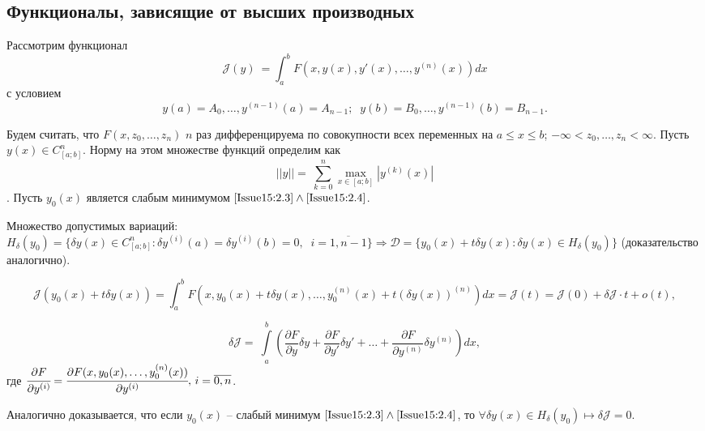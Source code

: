 
\subsection{Функционалы, зависящие от высших производных}
Рассмотрим функционал 
\begin{equation} 
	\label{Issue15:2.3}
	\mathcal{J}(y) ~ = \int_a^bF(x,y(x),y'(x),\dots , y^{(n)}(x))d x
\end{equation}
с условием 
\begin{equation}
	\label{Issue15:2.4}
	y(a)=A_0,\dots ,y^{(n-1)}(a)=A_{n-1};\;\;y(b)=B_0,\dots , y^{(n-1)}(b)=B_{n-1}.
\end{equation}

Будем считать, что $F(x,z_0,\dots , z_n)$ $n$ раз дифференцируема по совокупности всех переменных на $a\leqslant x\leqslant b$; $-\infty < z_0, \dots , z_n< \infty $. Пусть $y(x)\in C^n_{[a;b]}$. Норму на этом множестве функций определим как $$||y||= ~ \sum_{k=0}^{n}\underset{x \in [a;b]}{\max}|y^{(k)}(x)|$$.
Пусть $y_0(x)$ является слабым минимумом $\eqref{Issue15:2.3}\wedge \eqref{Issue15:2.4}$.

Множество допустимых вариаций: $H_\delta(y_0)=\{ \delta y(x) \in C_{[a;b]}^n: \delta y^{(i)}(a)=\delta y^{(i)}(b)=0,\;\;i=\overline{1,n-1}\}\Rightarrow \mathcal{D}=\{y_0(x)+t\delta y(x):\delta y(x)\in H_\delta (y_0) \}$ (доказательство аналогично).

\[
    \mathcal{J}(y_0(x)+t\delta y(x)) = \int^b_a F(x, y_0(x)+t\delta y(x),\dots ,y_0^{(n)}(x)+t(\delta y(x))^{(n)} )dx =\mathcal{J}(t)=\mathcal{J}(0)+\delta\mathcal{J} \cdot t+o(t), 
\]

\[
    \delta \mathcal{J}= ~ \int\limits_a^b\left(\frac{\partial F}{\partial y}\delta y + \frac{\partial F}{\partial y'}\delta y' +\dots +  \frac{\partial F}{\partial y^{(n)}}\delta y^{(n)} \right) dx,
\]
 где $\cfrac{\partial F}{\partial y^{(i)}}= \cfrac{\partial F(x,y_0(x),\dots,y_0^{(n)}(x))}{\partial y^{(i)}}, \, i = \overline{0, n}$.

Аналогично доказывается, что если $y_0(x)$ -- слабый минимум $\eqref{Issue15:2.3}\wedge\eqref{Issue15:2.4}$, то $\forall\delta y(x)\in H_\delta (y_0) \mapsto \delta \mathcal{J} = 0$.

